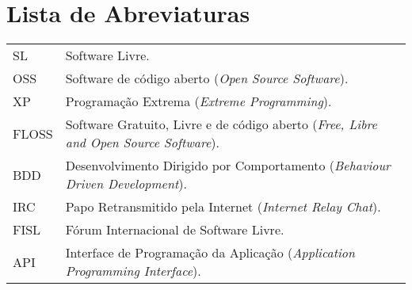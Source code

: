 \documentclass[12pt,twoside,letterpaper]{book}
\begin{document}
\tableofcontents %


\chapter{Lista de Abreviaturas}
\begin{tabular}{ll}
 		SL       & Software Livre.\\
 		OSS         & Software de código aberto (\emph{Open Source Software}).\\
 		XP       & Programação Extrema (\emph{Extreme Programming}).\\
 		FLOSS       & Software Gratuito, Livre e de código aberto (\emph{Free, Libre and Open Source
 Software}).\\
 		BDD       & Desenvolvimento Dirigido por Comportamento (\emph{Behaviour Driven Development}).\\
 		IRC       & Papo Retransmitido pela Internet (\emph{Internet Relay Chat}).\\
 		FISL       & Fórum Internacional de Software Livre.\\
 		API       & Interface de Programação da Aplicação (\emph{Application Programming Interface}).\\
\end{tabular}


\listoffigures               %
\listoftables                %

\mainmatter

\onehalfspacing              %

\appendix
\end{document}
